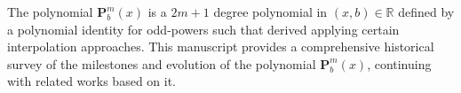 The polynomial $\mathbf{P}^m_b(x)$ is a $2m+1$ degree polynomial in $(x,b) \in \mathbb{R}$
defined by a polynomial identity for odd-powers such that derived applying certain interpolation approaches.
This manuscript provides a comprehensive historical survey of the milestones and evolution of the polynomial
$\mathbf{P}^m_b(x)$, continuing with related works based on it.

